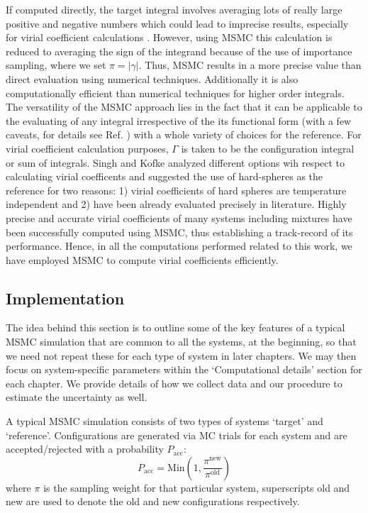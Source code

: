     If computed directly, the target integral involves averaging lots of really large positive and negative numbers which could lead to imprecise results, especially for virial coefficient calculations \cite{Singh2004}. However, using MSMC this calculation is reduced to averaging the sign of the integrand because of the use of importance sampling, where we set $\pi = |\gamma|$. Thus, MSMC results in a more precise value than direct evaluation using numerical techniques. Additionally it is also computationally efficient than numerical techniques for higher order integrals. The versatility of the MSMC approach lies in the fact that it can be applicable to the evaluating of any integral irrespective of the its functional form (with a few caveats, for details see Ref. \cite{Singh2004}) with a whole variety of choices for the reference. For virial coefficient calculation purposes, $\Gamma$ is taken to be the configuration integral or sum of integrals. Singh and Kofke \cite{Singh2004} analyzed different options wih respect to calculating virial coefficents and suggested the use of hard-spheres as the reference for two reasons: 1) virial coefficients of hard spheres are temperature independent and 2) have been already evaluated precisely in literature. Highly precise and accurate virial coefficients of many systems including mixtures \cite{Benjamin2007,Benjamin2007JPCC,Benjamin2009,Schultz2009,Schultz2009m,Schultz2010,Shaul2010,Shaul2011JCP,Shaul2012SC,Shaul2012,Kim2013,Schultz2014,Schultz2015,Feng2015} have been successfully computed using MSMC, thus establishing a track-record of its performance. Hence, in all the computations performed related to this work, we have employed MSMC to compute virial coefficients efficiently.

    \subsection{Implementation}
    \label{subsec:MSMCimplementation}
        The idea behind this section is to outline some of the key features of a typical MSMC simulation that are common to all the systems, at the beginning, so that we need not repeat these for each type of system in later chapters. We may then focus on system-specific parameters within the `Computational details' section for each chapter. We provide details of how we collect data and our procedure to estimate the uncertainty as well.

        A typical MSMC simulation consists of two types of systems `target' and `reference'. Configurations are generated via MC trials for each system and are accepted/rejected with a probability $P_{\text{acc}}$:
        \begin{equation}
            \label{eq:MCacceptance}
            P_{\text{acc}} = \text{Min} \left(1, \displaystyle\frac{\pi^{\text{new}}}{\pi^{\text{old}}} \right)
        \end{equation}
        where $\pi$ is the sampling weight for that particular system, superscripts old and new are used to denote the old and new configurations respectively.

